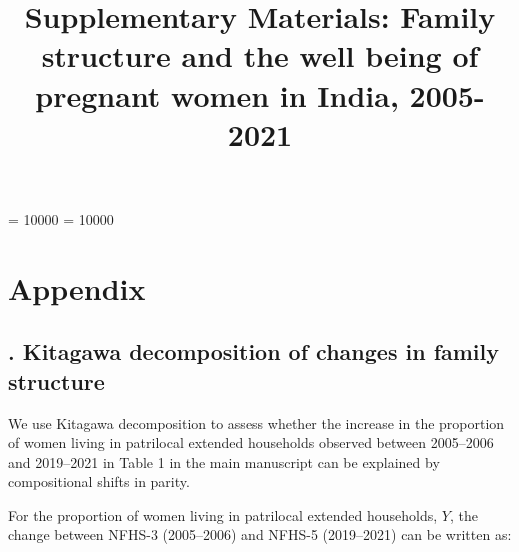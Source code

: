 \documentclass[10pt,twoside,reqno]{article}
\title{Supplementary Materials: Family structure and the well being of pregnant women in India, 2005-2021}
\date{}
\begin{document}
\onehalfspacing
\widowpenalty = 10000
\clubpenalty = 10000

\setlength{\parskip}{0ex}
\setlength{\parindent}{.7cm}
\setlength{\bibsep}{.18cm}
\setlength{\belowdisplayskip}{15pt} \setlength{\belowdisplayshortskip}{10pt}
\setlength{\abovedisplayskip}{15pt} \setlength{\abovedisplayshortskip}{10pt}


\maketitle
\thispagestyle{plain}


					
\maketitle
\thispagestyle{plain}


\section*{Appendix}

\setcounter{section}{0}
\renewcommand{\thesection}{\Alph{section}}

\setcounter{equation}{0}
\renewcommand{\theequation}{\thesection-\arabic{equation}}
\setcounter{figure}{0}
\renewcommand{\thefigure}{\thesection-\arabic{figure}}
\setcounter{table}{0}
\renewcommand{\thetable}{\thesection-\arabic{table}}

\subsection*{\thesection. Kitagawa decomposition of changes in family structure}
\label{sec:decomposition_parity}
We use Kitagawa decomposition \citep{kitagawa1955components} to assess whether the increase in the proportion of women living in patrilocal extended households observed between 2005--2006 and 2019--2021 in Table 1 in the main manuscript can be explained by compositional shifts in parity. 

For the proportion of women living in patrilocal extended households, $Y$, the change between NFHS-3 (2005--2006) and NFHS-5 (2019--2021) can be written as:
\end{document}
